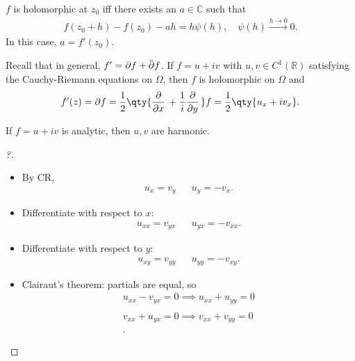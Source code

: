 \begin{proposition}

\(f\) is holomorphic at \(z_0\) iff there exists an
\(a\in {\mathbb{C}}\) such that
\begin{align*}  
f(z_0 + h) - f(z_0) - ah = h \psi(h), \quad \psi(h) \overset{h\to 0}\to 0
.\end{align*}
In this case, \(a = f'(z_0)\).

\end{proposition}

\begin{proposition}

Recall that in general,
\(f' = {\partial}f + \mkern 1.5mu\overline{\mkern-1.5mu{\partial}\mkern-1.5mu}\mkern 1.5muf\).
If \(f = u+iv\) with \(u, v\in C^1({\mathbb{R}})\) satisfying the
Cauchy-Riemann equations on \(\Omega\), then \(f\) is holomorphic on
\(\Omega\) and
\begin{align*}
f'(z) = {\partial}f = {1 \over 2} \qty{{\frac{\partial }{\partial x}\,} + {1\over i} {\frac{\partial }{\partial y}\,}}f = {1\over 2}\qty{u_x + iv_x}
.\end{align*}

\end{proposition}

\begin{theorem}

If \(f=u+iv\) is analytic, then \(u, v\) are harmonic.

\end{theorem}

\begin{proof}[?]

\envlist

\begin{itemize}
\item
  By CR,
  \begin{align*}
  u_x = v_y && u_y = -v_x
  .\end{align*}
\item
  Differentiate with respect to \(x\):
  \begin{align*}
  u_{xx} = v_{yx} && u_{yx} = -v_{xx}
  .\end{align*}
\item
  Differentiate with respect to \(y\):
  \begin{align*}
  u_{xy} = v_{yy} && u_{yy} = -v_{xy}
  .\end{align*}
\item
  Clairaut's theorem: partials are equal, so
  \begin{align*}
  u_{xx} - v_{yx} = 0 \implies u_{xx} + u_{yy} = 0 \\ \\
  v_{xx} + u_{yx} = 0 \implies v_{xx} + v_{yy} = 0 \\ \\
  .\end{align*}
\end{itemize}

\end{proof}

